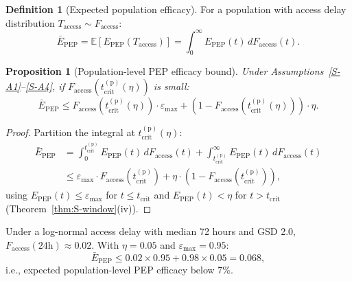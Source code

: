 \documentclass[12pt,a4paper]{article}
\theoremstyle{plain}
\newtheorem{proposition}{Proposition}
\theoremstyle{definition}
\newtheorem{definition}{Definition}
\theoremstyle{remark}
\newcommand{\Epep}{E_{\mathrm{PEP}}}
\newcommand{\tcrit}{t_{\mathrm{crit}}}
\newcommand{\E}{\mathbb{E}}
\begin{document}
\begin{definition}[Expected population efficacy]\label{def:S-pop-eff}
For a population with access delay distribution $T_{\mathrm{access}} \sim F_{\mathrm{access}}$:
\begin{equation}\label{eq:S-pop-eff}
    \bar{E}_{\mathrm{PEP}} = \E[\Epep(T_{\mathrm{access}})] = \int_0^\infty \Epep(t)\,dF_{\mathrm{access}}(t).
\end{equation}
\end{definition}

\begin{proposition}[Population-level PEP efficacy bound]\label{prop:S-efficacy bound}
Under Assumptions~\ref{S-A1}--\ref{S-A4}, if $F_{\mathrm{access}}(\tcrit^{(\mathrm{p})}(\eta))$ is small:
\begin{equation}\label{eq:S-efficacy bound}
    \bar{E}_{\mathrm{PEP}} \leq F_{\mathrm{access}}(\tcrit^{(\mathrm{p})}(\eta)) \cdot \varepsilon_{\max} + (1 - F_{\mathrm{access}}(\tcrit^{(\mathrm{p})}(\eta))) \cdot \eta.
\end{equation}
\end{proposition}

\begin{proof}
Partition the integral at $\tcrit^{(\mathrm{p})}(\eta)$:
\begin{align*}
    \bar{E}_{\mathrm{PEP}} &= \int_0^{\tcrit^{(\mathrm{p})}} \Epep(t)\,dF_{\mathrm{access}}(t) + \int_{\tcrit^{(\mathrm{p})}}^\infty \Epep(t)\,dF_{\mathrm{access}}(t) \\
    &\leq \varepsilon_{\max} \cdot F_{\mathrm{access}}(\tcrit^{(\mathrm{p})}) + \eta \cdot (1 - F_{\mathrm{access}}(\tcrit^{(\mathrm{p})})),
\end{align*}
using $\Epep(t) \leq \varepsilon_{\max}$ for $t \leq \tcrit$ and $\Epep(t) < \eta$ for $t > \tcrit$ (Theorem~\ref{thm:S-window}(iv)).
\end{proof}

Under a log-normal access delay with median 72 hours and GSD 2.0, $F_{\mathrm{access}}(24\text{h}) \approx 0.02$. With $\eta = 0.05$ and $\varepsilon_{\max} = 0.95$:
\[
    \bar{E}_{\mathrm{PEP}} \leq 0.02 \times 0.95 + 0.98 \times 0.05 = 0.068,
\]
i.e., expected population-level PEP efficacy below 7\%.
\end{document}

